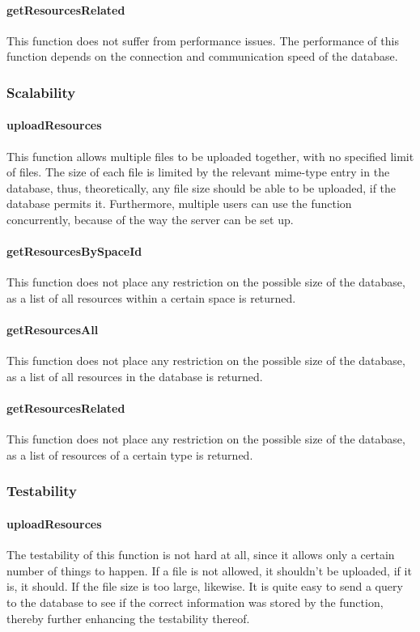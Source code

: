 \documentclass[a4paper]{article}
\begin{document}
\paragraph{getResourcesRelated}
This function does not suffer from performance issues. The performance of this function depends on the connection and communication speed of the database.

\subsubsection {Scalability}

\paragraph{uploadResources}
This function allows multiple files to be uploaded together, with no specified limit of files. The size of each file is limited by the relevant mime-type entry in the database, thus, theoretically, any file size should be able to be uploaded, if the database permits it. Furthermore, multiple users can use the function concurrently, because of the way the server can be set up.

\paragraph{getResourcesBySpaceId}
This function does not place any restriction on the possible size of the database, as a list of all resources within a certain space is returned.

\paragraph{getResourcesAll}
This function does not place any restriction on the possible size of the database, as a list of all resources in the database is returned.

\paragraph{getResourcesRelated}
This function does not place any restriction on the possible size of the database, as a list of resources of a certain type is returned.

\subsubsection {Testability}

\paragraph{uploadResources}
The testability of this function is not hard at all, since it allows only a certain number of things to happen. If a file is not allowed, it shouldn't be uploaded, if it is, it should. If the file size is too large, likewise. It is quite easy to send a query to the database to see if the correct information was stored by the function, thereby further enhancing the testability thereof.
\end{document}
